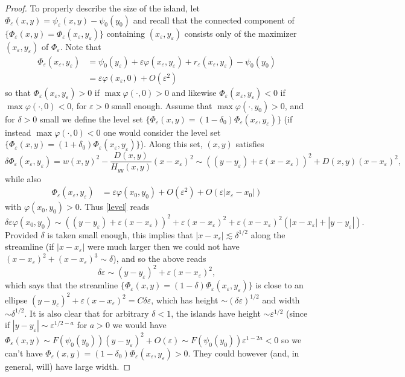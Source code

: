 \documentclass[11pt,reqno]{amsproc}
\newcommand{\ve}{\varepsilon}
\numberwithin{equation}{section}
\numberwithin{theorem}{section}
\numberwithin{prop}{section}
\numberwithin{cor}{section}
\numberwithin{lemma}{section}
\theoremstyle{remark}
\theoremstyle{definition}
\begin{document}
\begin{proof}
To properly describe the size of the island, let $\Phi_\ve(x,y) = \psi_\ve(x,y) - \psi_0(y_0)$ and recall that the connected component of $\lbrace \Phi_\ve(x,y) = \Phi_\ve(x_\ve,y_\ve) \rbrace$ containing $(x_\ve,y_\ve)$ consists only of the maximizer $(x_\ve,y_\ve)$ of $\Phi_\ve$.  Note that
\begin{align*}
\Phi_\ve(x_\ve,y_\ve) &= \psi_0(y_\ve) + \ve\varphi(x_\ve,y_\ve) + r_\ve(x_\ve,y_\ve) - \psi_0(y_0) \\
&= \ve\varphi(x_\ve,0) + O(\ve^2)
\end{align*}
so that $\Phi_\ve(x_\ve,y_\ve) >0$ if $\max \varphi(\cdot,0)>0$ and likewise $\Phi_\ve(x_\ve,y_\ve) <0$ if $\max \varphi(\cdot,0)<0$, for $\ve>0$ small enough. Assume that $\max\varphi(\cdot,y_0)>0$, and for $\delta>0$ small we define the level set $\{\Phi_\ve(x,y) = (1-\delta_0)\Phi_\ve(x_\ve,y_\ve) \}$ (if instead $\max\varphi(\cdot,0)<0$ one would consider the level set $\{\Phi_\ve(x,y) = (1+\delta_0)\Phi_\ve(x_\ve,y_\ve) \}$). Along this set, $(x,y)$ satisfies
\begin{equation}
 \delta \Phi_\ve(x_\ve,y_\ve) =  w(x,y)^2 - \frac{ D(x,y)}{H_{yy}(x,y)} (x-x_\ve)^2
 \sim ((y-y_\ve) + \ve (x-x_\ve))^2 + D(x,y) (x-x_\ve)^2,
 \label{level}
\end{equation}
while also
\begin{align*}
\Phi_\ve(x_\ve,y_\ve) &= \ve\varphi(x_0,y_0) + O(\ve^2) + O(\ve|x_\ve - x_0|)
\end{align*}
with $\varphi(x_0,y_0)>0$. Thus \eqref{level} reads
\begin{equation}
 \delta \ve\varphi(x_0,y_0) \sim ((y-y_\ve) + \ve (x-x_\ve))^2 + \ve (x-x_\ve)^2 + \ve (x-x_\ve)^2(|x-x_\ve| +|y-y_\ve|).
 \label{}
\end{equation}
Provided $\delta$ is taken small enough, this implies that $|x-x_\ve| \lesssim \delta^{1/2}$ along the streamline (if $|x-x_\ve|$ were much larger then we could not have $ (x-x_\ve)^2 + (x-x_\ve)^3 \sim \delta$),
 and so the above reads
 \begin{equation}
  \delta \ve \sim (y-y_\ve)^2 + \ve (x-x_\ve)^2,
  \label{}
 \end{equation}
which says that the streamline $\{\Phi_\ve(x,y) = (1-\delta)\Phi_\ve(x_\ve,y_\ve)\}$ is close to an ellipse $(y-y_\ve)^2 + \ve (x-x_\ve)^2 = C \delta \ve$, which has height $\sim (\delta \ve)^{1/2}$ and width $\sim \delta^{1/2}$. It is also clear that for arbitrary $\delta < 1$, the islands have height
 $\sim \ve^{1/2}$ (since if $|y-y_\ve| \sim \ve^{1/2-a}$ for $a>0$ we would have $\Phi_\ve(x,y) \sim F(\psi_0(y_0))(y-y_\ve)^2 + O(\ve) \sim F(\psi_0(y_0))\ve^{1-2a} < 0$ so we can't have $\Phi_\ve(x,y) = (1-\delta_0)\Phi_\ve(x_\ve,y_\ve) > 0$. They could however (and, in general, will) have large width.
 \end{proof}
\end{document}
